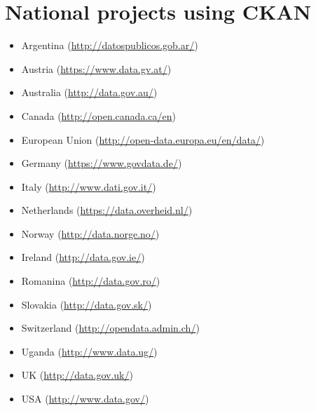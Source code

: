 \documentclass{article}
\begin{document}
\clearpage
\appendix

\section{National \cite{open-data} projects using CKAN}

\begin{itemize}
    \item Argentina (\url{http://datospublicos.gob.ar/})
    \item Austria   (\url{https://www.data.gv.at/})
    \item Australia (\url{http://data.gov.au/})
    \item Canada (\url{http://open.canada.ca/en})
    \item European Union (\url{http://open-data.europa.eu/en/data/})
    \item Germany (\url{https://www.govdata.de/})
    \item Italy (\url{http://www.dati.gov.it/})
    \item Netherlands (\url{https://data.overheid.nl/})
    \item Norway (\url{http://data.norge.no/})
    \item Ireland (\url{http://data.gov.ie/})
    \item Romanina (\url{http://data.gov.ro/})
    \item Slovakia (\url{http://data.gov.sk/})
    \item Switzerland (\url{http://opendata.admin.ch/})
    \item Uganda (\url{http://www.data.ug/})
    \item UK (\url{http://data.gov.uk/})
    \item USA (\url{http://www.data.gov/})
\end{itemize}

\clearpage
\printbibliography
\end{document}
